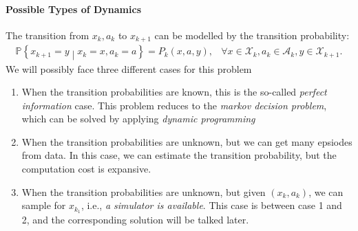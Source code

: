 \paragraph{Possible Types of Dynamics}
The transition from $x_k,a_k$ to $x_{k+1}$ can be modelled by the transition probability:
\[
\begin{array}{ll}
\mathbb{P}\left\{
x_{k+1}=y\middle|x_k=x,a_k=a
\right\}
=
P_k(x,a,y),
&
\forall x\in\mathcal{X}_k,a_k\in\mathcal{A}_k,y\in\mathcal{X}_{k+1}.
\end{array}
\]
We will possibly face three different cases for this problem
\begin{enumerate}
\item
When the transition probabilities are known, this is the so-called \emph{perfect information} case. This problem reduces to the \emph{markov decision problem}, which can be solved by applying \emph{dynamic programming}
\item
When the transition probabilities are unknown, but we can get many epsiodes from data. In this case, we can estimate the transition probability, but the computation cost is expansive.
\item
When the transition probabilities are unknown, but given $(x_k,a_k)$, we can sample for $x_{k_1}$, i.e., \emph{a simulator is available}. This case is between case 1 and 2, and the corresponding solution will be talked later.
\end{enumerate}

